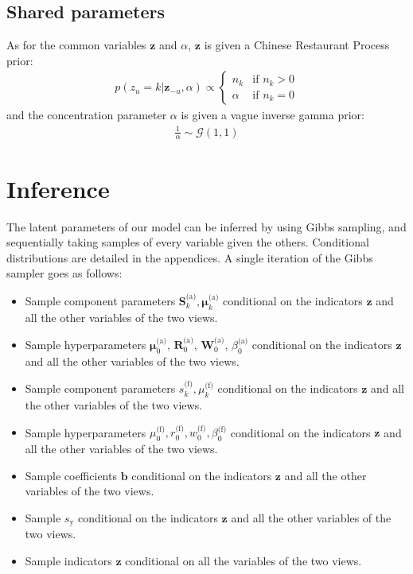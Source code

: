 \documentclass[smallextended]{svjour3}          %
\newcommand{\Muo}{\boldsymbol{\mu}_{0}^\text{(a)}}
\newcommand{\Ro}{\mathbf{R}_{0}^\text{(a)}}
\newcommand{\Wo}{\mathbf{W}_{0}^\text{(a)}}
\newcommand{\betaoa}{\beta_{0}^\text{(a)}}
\newcommand{\muo}{\mu_{0}^\text{(f)}}
\newcommand{\ro}{r_{0}^\text{(f)}}
\newcommand{\wo}{w_{0}^\text{(f)}}
\newcommand{\betaof}{\beta_{0}^\text{(f)}}
\newcommand{\Muk}{\boldsymbol{\mu}_{k}^\text{(a)}}
\newcommand{\Sk}{\mathbf{S}_{k}^\text{(a)}}
\newcommand{\muk}{\mu_{k}^\text{(f)}}
\newcommand{\sk}{s_{k}^\text{(f)}}
\begin{document}
\subsection{Shared parameters}\label{sec:sharedparams}
As for the common variables $\mathbf{z}$ and $\alpha$, $\mathbf{z}$ is given a Chinese Restaurant Process prior:
\begin{align}
\label{eq:prior_z_CRP}
p(z_u = k | \mathbf{z}_{-u}, \alpha) \propto 
\begin{cases}
n_{k} & \text{if } n_{k}>0 \\
\alpha & \text{if } n_{k}=0
\end{cases}
\end{align}
and the concentration parameter $\alpha$ is given a vague inverse gamma prior:
\begin{align*}
\frac{1}{\alpha} \sim \mathcal{G}(1,1)
\end{align*}



\section{Inference}\label{sec:inference}
The latent parameters of our model can be inferred by using Gibbs sampling, and sequentially taking samples of every variable given the others. Conditional distributions are detailed in the appendices. A single iteration of the Gibbs sampler goes as follows: 

\begin{itemize}
\item Sample component parameters $\Sk, \Muk$ conditional on the indicators $\mathbf{z}$ and all the other variables of the two views.
\item Sample hyperparameters $\Muo$, $\Ro$, $\Wo$, $\betaoa$ conditional on  the indicators $\mathbf{z}$ and all the other variables of the two views.
\item Sample component parameters $\sk, \muk$ conditional on the indicators $\mathbf{z}$ and all the other variables of the two views.
\item Sample hyperparameters $\muo, \ro, \wo, \betaof$ conditional on the indicators $\mathbf{z}$ and all the other variables of the two views.
\item Sample coefficients $\mathbf{b}$ conditional on the indicators $\mathbf{z}$ and all the other variables of the two views.
\item Sample $s_{\text{y}}$ conditional on the indicators $\mathbf{z}$ and all the other variables of the two views.
\item Sample indicators $\mathbf{z}$ conditional on all the variables of the two views.
\end{itemize} 
\end{document}
